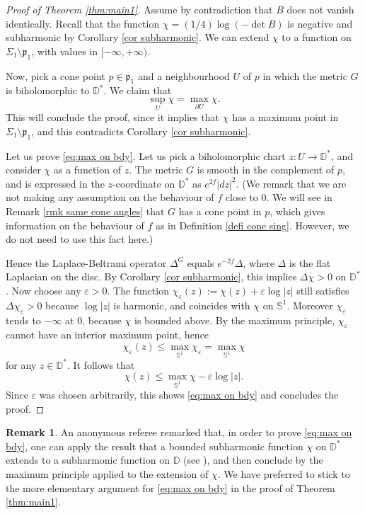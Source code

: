 \documentclass[JEP,XML,SOM,Unicode,NoEqCountersInSection,published]{cedram}
\let\epsilon\varepsilon
\theoremstyle{definition}
\newtheorem{remark}[cor]{Remark}
\begin{document}
\begin{proof}[Proof of Theorem \ref{thm:main1}]
Assume by contradiction that $B$ does not vanish identically. Recall that the function $\chi=(1/4)\log(-\det B)$ is negative and subharmonic by Corollary \ref{cor subharmonic}. We can extend $\chi$ to a function on $\Sigma_1\setminus \mathfrak p_1$, with values in $[-\infty,+\infty)$.

Now, pick a cone point $p\in\mathfrak p_1$ and a neighbourhood $U$ of $p$ in which the metric $G$ is biholomorphic to $\mathbb D^*$. We claim that
\begin{equation}\label{eq:max on bdy}
\sup_U \chi=\max_{\partial U}\chi.
\end{equation}
This will conclude the proof, since it implies that $\chi$ has a maximum point in $\Sigma_1\setminus \mathfrak p_1$, and this contradicts Corollary \ref{cor subharmonic}.

Let us prove \eqref{eq:max on bdy}. Let us pick a biholomorphic chart $z:U\to\mathbb D^*$, and consider $\chi$ as a function of $z$. The metric $G$ is {smooth in the complement of $p$, and is expressed in the $z$-coordinate on $\mathbb D^*$ as $e^{2f}|dz|^2$.} {(We remark that we are not making any assumption on the behaviour of $f$ close to $0$. We will see in Remark \ref{rmk same cone angles} that $G$ has a cone point in $p$, which gives information on the behaviour of $f$ as in Definition \ref{defi cone sing}. However, we do not need to use this fact here.)}

Hence the Laplace-Beltrami operator $\Delta^G$ equals $e^{-2f}\Delta$, where $\Delta$ is the flat Laplacian on the disc. By Corollary \ref{cor subharmonic}, this implies $\Delta\chi>0$ on $\mathbb D^*$. Now choose any $\epsilon>0$. The function $\chi_\epsilon(z):=\chi(z)+\epsilon\log|z|$ still satisfies $\Delta\chi_\epsilon>0$ because $\log|z|$ is harmonic, and coincides with $\chi$ on $\mathbb S^1$. Moreover $\chi_\epsilon$ tends to $-\infty$ at $0$, because $\chi$ is bounded above. By the maximum principle, $\chi_\epsilon$ cannot have an interior maximum point, hence
\[
\chi_\epsilon(z)\leq \max_{\mathbb S^1}\chi_\epsilon=\max_{\mathbb S^1}\chi
\]
for any $z\in \mathbb D^*$. It follows that
\[
\chi(z)\leq \max_{\mathbb S^1}\chi-\epsilon\log|z|.
\]
Since $\epsilon$ was chosen arbitrarily, this shows \eqref{eq:max on bdy} and concludes the proof.
\end{proof}

\begin{remark}\label{referee}
An anonymous referee remarked that, in order to prove \eqref{eq:max on bdy}, one can apply the result that a bounded subharmonic function $\chi$ on $\mathbb D^*$ extends to a subharmonic function on $\mathbb D$ (see \cite[Th.\,5.18]{zbMATH03652704}), and then conclude by the maximum principle applied to the extension of $\chi$.
We have preferred to stick to the more elementary argument for \eqref{eq:max on bdy} in the proof of Theorem \ref{thm:main1}.
\end{remark}
\end{document}
